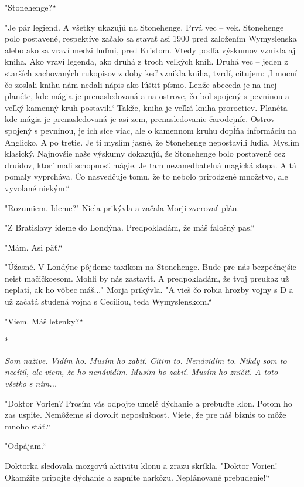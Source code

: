 \documentclass{book}
\begin{document}
"Stonehenge?“

"Je pár legiend. A všetky ukazujú na Stonehenge. Prvá vec – vek. Stonehenge polo postavené, respektíve začalo sa stavať asi 1900 pred založením Wymyslenska alebo ako sa vraví medzi ľuďmi, pred Kristom. Vtedy podľa výskumov vznikla aj kniha. Ako vraví legenda, ako druhá z troch veľkých kníh. Druhá vec – jeden z starších zachovaných rukopisov z doby keď vznikla kniha, tvrdí, citujem: ‚I mocní čo zoslali knihu nám nedali nápis ako lúštiť písmo. Lenže abeceda je na inej planéte, kde mágia je prenasledovaná a na ostrove, čo bol spojený s pevninou a veľký kamenný kruh postavili.‘ Takže, kniha je veľká kniha proroctiev. Planéta kde mágia je prenasledovaná je asi zem, prenasledovanie čarodejníc. Ostrov spojený s pevninou, je ich síce viac, ale o kamennom kruhu dopĺňa informáciu na Anglicko. A po tretie. Je ti myslím jasné, že Stonehenge nepostavili ľudia. Myslím klasický. Najnovšie naše výskumy dokazujú, že Stonehenge bolo postavené cez druidov, ktorí mali schopnosť mágie. Je tam nezanedbateľná magická stopa. A tá pomaly vyprcháva. Čo nasvedčuje tomu, že to nebolo prirodzené množstvo, ale vyvolané niekým.“

"Rozumiem. Ideme?"$ $ Niela prikývla a začala Morji zverovať plán.

"Z Bratislavy ideme do Londýna. Predpokladám, že máš falošný pas.“

"Mám. Asi päť.“

"Úžasné. V Londýne pôjdeme taxíkom na Stonehenge. Bude pre nás bezpečnejšie neisť mačičkoesom. Mohli by nás zastaviť. A predpokladám, že tvoj preukaz už neplatí, ak ho vôbec máš..."$ $ Morja prikývla. "$ $A vieš čo robia hrozby vojny s D a už začatá studená vojna s Cecíliou, teda Wymyslenskom.“

"Viem. Máš letenky?“

\begin{center}
*
\end{center}

\textit{Som nažive. Vidím ho. Musím ho zabiť. Cítim to. Nenávidím to. Nikdy som to necítil, ale viem, že ho nenávidím. Musím ho zabiť. Musím ho zničiť. A toto všetko s ním...}

"Doktor Vorien? Prosím vás odpojte umelé dýchanie a prebuďte klon. Potom ho zas uspite. Nemôžeme si dovoliť neposlušnosť. Viete, že pre náš biznis to môže mnoho stáť.“

"$ $Odpájam.“

Doktorka sledovala mozgovú aktivitu klonu a zrazu skríkla. "Doktor Vorien! Okamžite pripojte dýchanie a zapnite narkózu. Neplánované prebudenie!“
\end{document}
